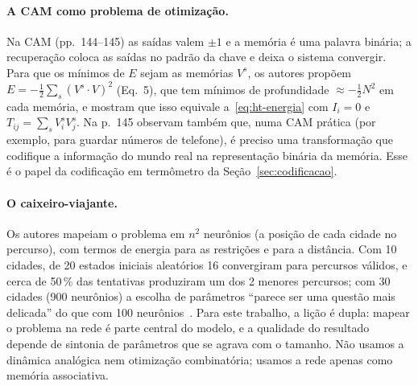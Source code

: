 \paragraph{A CAM como problema de otimização.} Na CAM (pp.~144--145) as saídas valem $\pm1$ e a memória é uma
palavra binária; a recuperação coloca as saídas no padrão da chave e deixa o sistema convergir. Para que os
mínimos de $E$ sejam as memórias $V^s$, os autores propõem $E=-\tfrac12\sum_s(V^s\cdot V)^2$ (Eq.~5), que
tem mínimos de profundidade ${\approx}-\tfrac12N^2$ em cada memória, e mostram que isso equivale
a~\eqref{eq:ht-energia} com $I_i=0$ e $T_{ij}=\sum_sV_i^sV_j^s$. Na p.~145 observam também que, numa CAM
prática (por exemplo, para guardar números de telefone), é preciso uma transformação que codifique a
informação do mundo real na representação binária da memória. Esse é o papel da codificação em termômetro
da Seção~\ref{sec:codificacao}.

\paragraph{O caixeiro-viajante.} Os autores mapeiam o problema em $n^2$ neurônios (a posição de cada cidade no
percurso), com termos de energia para as restrições e para a distância. Com 10 cidades, de 20 estados
iniciais aleatórios 16 convergiram para percursos válidos, e cerca de 50\,\% das tentativas produziram um dos
2 menores percursos; com 30 cidades (900 neurônios) a escolha de parâmetros ``parece ser uma questão mais
delicada'' do que com 100 neurônios~\cite[p.~148]{hopfieldtank1985}. Para este trabalho, a lição é dupla:
mapear o problema na rede é parte central do modelo, e a qualidade do resultado depende de sintonia de
parâmetros que se agrava com o tamanho. Não usamos a dinâmica analógica nem otimização combinatória; usamos a
rede apenas como memória associativa.

